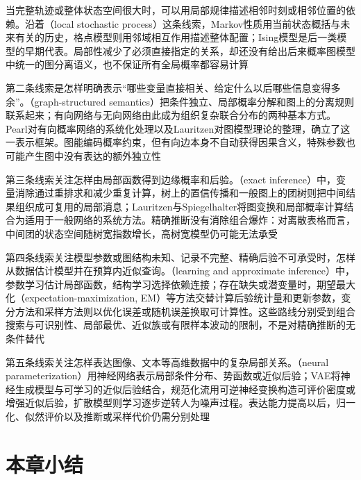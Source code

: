 当完整轨迹或整体状态空间很大时，可以用局部规律描述相邻时刻或相邻位置的依赖。沿着（local stochastic process）这条线索，Markov性质用当前状态概括与未来有关的历史，格点模型则用邻域相互作用描述整体配置；Ising模型是后一类模型的早期代表。局部性减少了必须直接指定的关系，却还没有给出后来概率图模型中统一的图分离语义，也不保证所有全局概率都容易计算

第二条线索是怎样明确表示“哪些变量直接相关、给定什么以后哪些信息变得多余”。（graph-structured semantics）把条件独立、局部概率分解和图上的分离规则联系起来；有向网络与无向网络由此成为组织复杂联合分布的两种基本方式。Pearl对有向概率网络的系统化处理以及Lauritzen对图模型理论的整理，确立了这一表示框架。图能编码概率约束，但有向边本身不自动获得因果含义，特殊参数也可能产生图中没有表达的额外独立性

第三条线索关注怎样由局部函数得到边缘概率和后验。（exact inference）中，变量消除通过重排求和减少重复计算，树上的置信传播和一般图上的团树则把中间结果组织成可复用的局部消息；Lauritzen与Spiegelhalter将图变换和局部概率计算结合为适用于一般网络的系统方法。精确推断没有消除组合爆炸：对离散表格而言，中间团的状态空间随树宽指数增长，高树宽模型仍可能无法承受

第四条线索关注模型参数或图结构未知、记录不完整、精确后验不可承受时，怎样从数据估计模型并在预算内近似查询。（learning and approximate inference）中，参数学习估计局部函数，结构学习选择依赖连接；存在缺失或潜变量时，期望最大化（expectation-maximization, EM）等方法交替计算后验统计量和更新参数，变分方法和采样方法则以优化误差或随机误差换取可计算性。这些路线分别受到组合搜索与可识别性、局部最优、近似族或有限样本波动的限制，不是对精确推断的无条件替代

第五条线索关注怎样表达图像、文本等高维数据中的复杂局部关系。（neural parameterization）用神经网络表示局部条件分布、势函数或近似后验；VAE将神经生成模型与可学习的近似后验结合，规范化流用可逆神经变换构造可评价密度或增强近似后验，扩散模型则学习逐步逆转人为噪声过程。表达能力提高以后，归一化、似然评价以及推断或采样代价仍需分别处理

\section{本章小结}
\label{sec:pgm-overview-summary}


